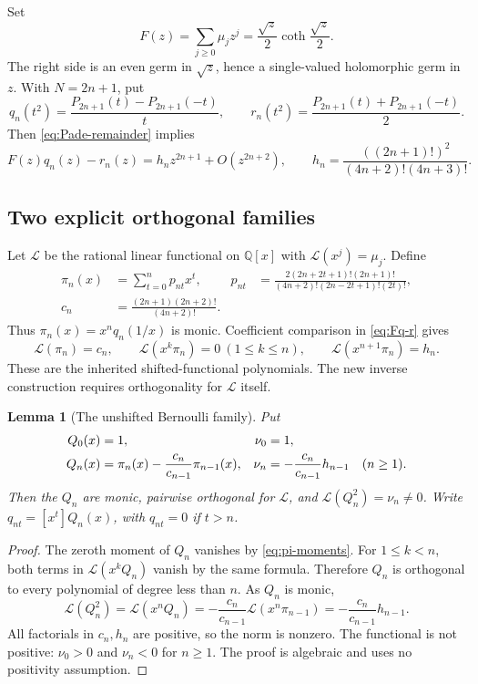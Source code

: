 \documentclass[11pt,letterpaper]{article}
\newtheorem{lemma}[theorem]{Lemma}
\theoremstyle{definition}
\theoremstyle{remark}
\newcommand{\Q}{\mathbb Q}
\numberwithin{equation}{section}
\begin{document}
Set
\begin{equation}\label{eq:Fmu}
 F(z)=\sum_{j\geq0}\mu_jz^j
 =\frac{\sqrt z}{2}\coth\frac{\sqrt z}{2}.
\end{equation}
The right side is an even germ in $\sqrt z$, hence a single-valued
holomorphic germ in $z$. With $N=2n+1$, put
\[
 q_n(t^2)=\frac{P_{2n+1}(t)-P_{2n+1}(-t)}t,
 \qquad
 r_n(t^2)=\frac{P_{2n+1}(t)+P_{2n+1}(-t)}2.
\]
Then \eqref{eq:Pade-remainder} implies
\begin{equation}\label{eq:Fq-r}
 F(z)q_n(z)-r_n(z)=h_nz^{2n+1}+O(z^{2n+2}),
 \qquad
 h_n=\frac{((2n+1)!)^2}{(4n+2)!(4n+3)!}.
\end{equation}

\subsection{Two explicit orthogonal families}

Let $\mathcal L$ be the rational linear functional on $\Q[x]$ with
$\mathcal L(x^j)=\mu_j$. Define
\begin{align}
 \pi_n(x)&=\sum_{t=0}^n p_{nt}x^t,
 &p_{nt}&=
 \frac{2(2n+2t+1)!(2n+1)!}
 {(4n+2)!(2n-2t+1)!(2t)!},
 \label{eq:pi-coeff}\\
 c_n&=\frac{(2n+1)(2n+2)!}{(4n+2)!}.
 \label{eq:cn}
\end{align}
Thus $\pi_n(x)=x^nq_n(1/x)$ is monic. Coefficient comparison in
\eqref{eq:Fq-r} gives
\begin{equation}\label{eq:pi-moments}
 \mathcal L(\pi_n)=c_n,\qquad
 \mathcal L(x^k\pi_n)=0\ (1\leq k\leq n),\qquad
 \mathcal L(x^{n+1}\pi_n)=h_n.
\end{equation}
These are the inherited shifted-functional polynomials. The new inverse
construction requires orthogonality for $\mathcal L$ itself.

\begin{lemma}[The unshifted Bernoulli family]
\label{lem:Qorthogonal}
Put
\begin{align}
 Q_0(x)&=1,&\nu_0&=1,\notag\\
 Q_n(x)&=\pi_n(x)-\frac{c_n}{c_{n-1}}\pi_{n-1}(x),
 &\nu_n&=-\frac{c_n}{c_{n-1}}h_{n-1}\quad(n\geq1).
 \label{eq:Qnu}
\end{align}
Then the $Q_n$ are monic, pairwise orthogonal for $\mathcal L$, and
$\mathcal L(Q_n^2)=\nu_n\ne0$. Write
$q_{nt}=[x^t]Q_n(x)$, with $q_{nt}=0$ if $t>n$.
\end{lemma}
\begin{proof}
The zeroth moment of $Q_n$ vanishes by \eqref{eq:pi-moments}.
For $1\leq k<n$, both terms in
$\mathcal L(x^kQ_n)$ vanish by the same formula. Therefore $Q_n$
is orthogonal to every polynomial of degree less than $n$.
As $Q_n$ is monic,
\[
 \mathcal L(Q_n^2)=\mathcal L(x^nQ_n)
 =-\frac{c_n}{c_{n-1}}\mathcal L(x^n\pi_{n-1})
 =-\frac{c_n}{c_{n-1}}h_{n-1}.
\]
All factorials in $c_n,h_n$ are positive, so the norm is nonzero.
The functional is not positive: $\nu_0>0$ and $\nu_n<0$ for
$n\geq1$. The proof is algebraic and uses no positivity assumption.
\end{proof}
\end{document}
